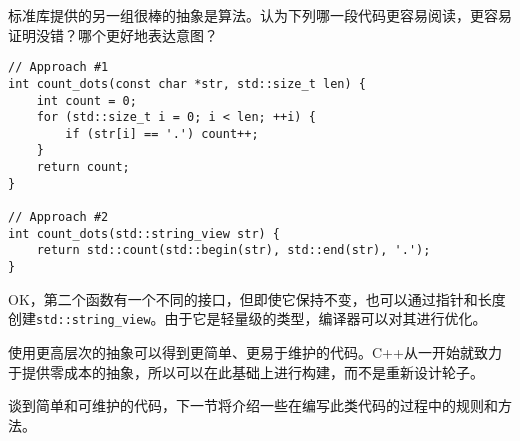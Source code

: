 标准库提供的另一组很棒的抽象是算法。认为下列哪一段代码更容易阅读，更容易证明没错？哪个更好地表达意图？

\begin{lstlisting}[style=styleCXX]
// Approach #1
int count_dots(const char *str, std::size_t len) {
	int count = 0;
	for (std::size_t i = 0; i < len; ++i) {
		if (str[i] == '.') count++;
	}
	return count;
}

// Approach #2
int count_dots(std::string_view str) {
	return std::count(std::begin(str), std::end(str), '.');
}

\end{lstlisting}

OK，第二个函数有一个不同的接口，但即使它保持不变，也可以通过指针和长度创建\texttt{std::string\_view}。由于它是轻量级的类型，编译器可以对其进行优化。

使用更高层次的抽象可以得到更简单、更易于维护的代码。C++从一开始就致力于提供零成本的抽象，所以可以在此基础上进行构建，而不是重新设计轮子。

谈到简单和可维护的代码，下一节将介绍一些在编写此类代码的过程中的规则和方法。















